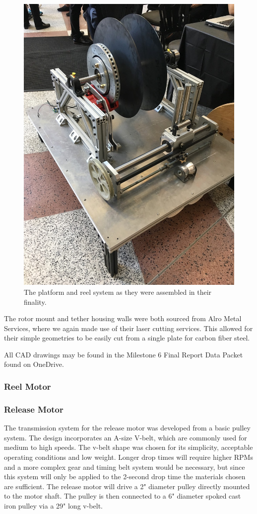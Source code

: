 \begin{figure}[ht]
  \centering
  \includegraphics[width=.4\textwidth]{TUMBR/RealUnitReel.jpg}
  \caption{\label{fig:RealUnitReel}The platform and reel system as they were assembled in their finality.}
\end{figure}

The rotor mount and tether housing walls were both sourced from Alro Metal Services, where we again made use of their laser cutting services. This allowed for their simple geometries to be easily cut from a single plate for carbon fiber steel. 

All CAD drawings may be found in the Milestone 6 Final Report Data Packet found on OneDrive. 

\subsubsection{Reel Motor}

\subsubsection{Release Motor}

The transmission system for the release motor was developed from a basic pulley system. The design incorporates an A-size V-belt, which are commonly used for medium to high speeds. The v-belt shape was chosen for its simplicity, acceptable operating conditions and low weight. Longer drop times will require higher RPMs and a more complex gear and timing belt system would be necessary, but since this system will only be applied to the 2-second drop time the materials chosen are sufficient. The release motor will drive a 2" diameter pulley directly mounted to the motor shaft. The pulley is then connected to a 6" diameter spoked cast iron pulley via a 29" long v-belt. 

